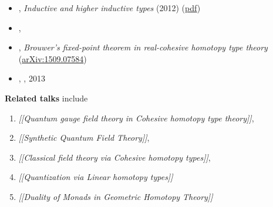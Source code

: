 \documentclass[12pt,titlepage]{article}
\theoremstyle{plain}
\theoremstyle{definition}
\theoremstyle{remark}
\begin{document}
\begin{itemize}
\item {}, \emph{Inductive and higher inductive types} (2012) (\href{http://www.math.ias.edu/~mshulman/hottminicourse2012/04induction.pdf}{pdf})


\item {}, 


\item {}, \emph{Brouwer's fixed-point theorem in real-cohesive homotopy type theory} (\href{http://arxiv.org/abs/1509.07584}{arXiv:1509.07584})


\item {}, , 2013



\end{itemize}


\textbf{Related talks} include

\begin{enumerate}%
\item \emph{[[Quantum gauge field theory in Cohesive homotopy type theory]]},


\item \emph{[[Synthetic Quantum Field Theory]]},


\item \emph{[[Classical field theory via Cohesive homotopy types]]},


\item \emph{[[Quantization via Linear homotopy types]]}


\item \emph{[[Duality of Monads in Geometric Homotopy Theory]]}



\end{enumerate}
\end{document}
